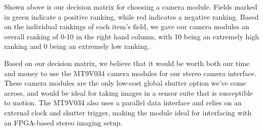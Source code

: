 \par
Shown above is our decision matrix for choosing a camera module. Fields marked in green indicate a positive ranking, while red indicates a negative ranking. Based on the individual rankings of each item's field, we gave our camera modules an overall ranking of 0-10 in the right hand column, with 10 being an extremely high ranking and 0 being an extremely low ranking.
\doublespacing
\par
Based on our decision matrix, we believe that it would be worth both our time and money to use the MT9V034 camera modules for our stereo camera interface. These camera modules are the only low-cost global shutter option we've come across, and would be ideal for taking images in a sensor suite that is susceptible to motion. The MT9V034 also uses a parallel data interface and relies on an external clock and shutter trigger, making the module ideal for interfacing with an FPGA-based stereo imaging setup.
